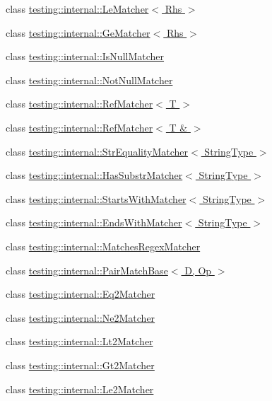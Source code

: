 \begin{DoxyCompactItemize}
class \hyperlink{classtesting_1_1internal_1_1_le_matcher}{testing\+::internal\+::\+Le\+Matcher$<$ Rhs $>$}
\item 
class \hyperlink{classtesting_1_1internal_1_1_ge_matcher}{testing\+::internal\+::\+Ge\+Matcher$<$ Rhs $>$}
\item 
class \hyperlink{classtesting_1_1internal_1_1_is_null_matcher}{testing\+::internal\+::\+Is\+Null\+Matcher}
\item 
class \hyperlink{classtesting_1_1internal_1_1_not_null_matcher}{testing\+::internal\+::\+Not\+Null\+Matcher}
\item 
class \hyperlink{classtesting_1_1internal_1_1_ref_matcher}{testing\+::internal\+::\+Ref\+Matcher$<$ T $>$}
\item 
class \hyperlink{classtesting_1_1internal_1_1_ref_matcher_3_01_t_01_6_01_4}{testing\+::internal\+::\+Ref\+Matcher$<$ T \& $>$}
\item 
class \hyperlink{classtesting_1_1internal_1_1_str_equality_matcher}{testing\+::internal\+::\+Str\+Equality\+Matcher$<$ String\+Type $>$}
\item 
class \hyperlink{classtesting_1_1internal_1_1_has_substr_matcher}{testing\+::internal\+::\+Has\+Substr\+Matcher$<$ String\+Type $>$}
\item 
class \hyperlink{classtesting_1_1internal_1_1_starts_with_matcher}{testing\+::internal\+::\+Starts\+With\+Matcher$<$ String\+Type $>$}
\item 
class \hyperlink{classtesting_1_1internal_1_1_ends_with_matcher}{testing\+::internal\+::\+Ends\+With\+Matcher$<$ String\+Type $>$}
\item 
class \hyperlink{classtesting_1_1internal_1_1_matches_regex_matcher}{testing\+::internal\+::\+Matches\+Regex\+Matcher}
\item 
class \hyperlink{classtesting_1_1internal_1_1_pair_match_base}{testing\+::internal\+::\+Pair\+Match\+Base$<$ D, Op $>$}
\item 
class \hyperlink{classtesting_1_1internal_1_1_eq2_matcher}{testing\+::internal\+::\+Eq2\+Matcher}
\item 
class \hyperlink{classtesting_1_1internal_1_1_ne2_matcher}{testing\+::internal\+::\+Ne2\+Matcher}
\item 
class \hyperlink{classtesting_1_1internal_1_1_lt2_matcher}{testing\+::internal\+::\+Lt2\+Matcher}
\item 
class \hyperlink{classtesting_1_1internal_1_1_gt2_matcher}{testing\+::internal\+::\+Gt2\+Matcher}
\item 
class \hyperlink{classtesting_1_1internal_1_1_le2_matcher}{testing\+::internal\+::\+Le2\+Matcher}

\end{DoxyCompactItemize}
